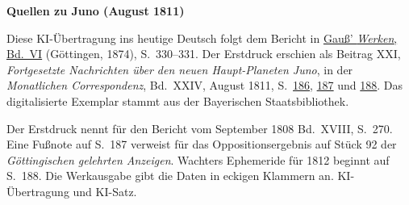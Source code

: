 \clearpage\thispagestyle{empty}
\begin{center}\textbf{Quellen zu Juno (August 1811)}\end{center}
\noindent Diese KI-Übertragung ins heutige Deutsch folgt dem Bericht in \href{https://gdz.sub.uni-goettingen.de/id/PPN236007467}{Gauß’ \textit{Werken}, Bd.~VI} (Göttingen, 1874), S.~330--331. Der Erstdruck erschien als Beitrag XXI, \textit{Fortgesetzte Nachrichten über den neuen Haupt-Planeten Juno}, in der \textit{Monatlichen Correspondenz}, Bd.~XXIV, August 1811, S.~\href{https://api.digitale-sammlungen.de/iiif/image/v2/bsb10538613_00196/full/1600,/0/default.jpg}{186}, \href{https://api.digitale-sammlungen.de/iiif/image/v2/bsb10538613_00197/full/1600,/0/default.jpg}{187} und \href{https://api.digitale-sammlungen.de/iiif/image/v2/bsb10538613_00198/full/1600,/0/default.jpg}{188}. Das digitalisierte Exemplar stammt aus der Bayerischen Staatsbibliothek.
\par\smallskip\noindent Der Erstdruck nennt für den Bericht vom September 1808 Bd.~XVIII, S.~270. Eine Fußnote auf S.~187 verweist für das Oppositionsergebnis auf Stück 92 der \textit{Göttingischen gelehrten Anzeigen}. Wachters Ephemeride für 1812 beginnt auf S.~188. Die Werkausgabe gibt die Daten in eckigen Klammern an. KI-Übertragung und KI-Satz.
\clearpage
